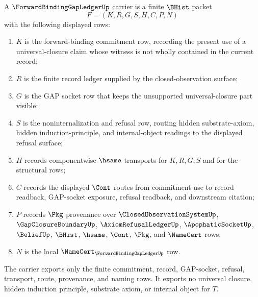 \begin{definition}
\label{def:forward-binding-gap-ledger-carrier}
A $\ForwardBindingGapLedgerUp$ carrier is a finite $\BHist$ packet
$$
F=(K,R,G,S,H,C,P,N)
$$
with the following displayed rows:
\begin{enumerate}
\item $K$ is the forward-binding commitment row, recording the present use of a universal-closure claim whose witness is not wholly contained in the current record;
\item $R$ is the finite record ledger supplied by the closed-observation surface;
\item $G$ is the GAP socket row that keeps the unsupported universal-closure part visible;
\item $S$ is the noninternalization and refusal row, routing hidden substrate-axiom, hidden induction-principle, and internal-object readings to the displayed refusal surface;
\item $H$ records componentwise $\hsame$ transports for $K,R,G,S$ and for the structural rows;
\item $C$ records the displayed $\Cont$ routes from commitment use to record readback, GAP-socket exposure, refusal readback, and downstream citation;
\item $P$ records $\Pkg$ provenance over $\ClosedObservationSystemUp$, $\GapClosureBoundaryUp$, $\AxiomRefusalLedgerUp$, $\ApophaticSocketUp$, $\BeliefUp$, $\BHist$, $\hsame$, $\Cont$, $\Pkg$, and $\NameCert$ rows;
\item $N$ is the local $\NameCert_{\ForwardBindingGapLedgerUp}$ row.
\end{enumerate}
The carrier exports only the finite commitment, record, GAP-socket, refusal, transport, route, provenance, and naming rows. It exports no universal closure, hidden induction principle, substrate axiom, or internal object for $T$.
\end{definition}

